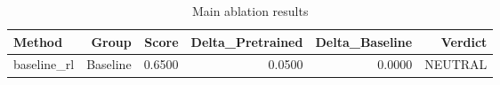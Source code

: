 \begin{table}[htbp]
\centering
\caption{Main ablation results}
\label{tab:main-results}
\begin{tabular}{lrrrrr}
\toprule
\textbf{Method} & \textbf{Group} & \textbf{Score} & \textbf{Delta\_Pretrained} & \textbf{Delta\_Baseline} & \textbf{Verdict} \\
\midrule
baseline\_rl & Baseline & 0.6500 & 0.0500 & 0.0000 & NEUTRAL \\
\bottomrule
\end{tabular}
\end{table}